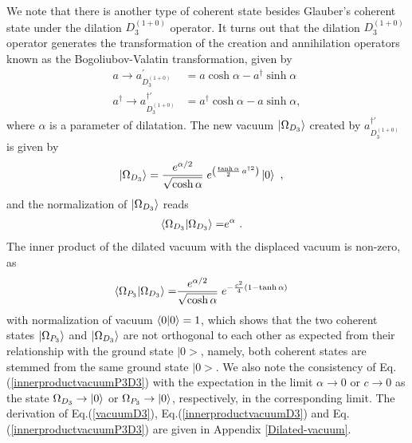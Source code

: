 \documentclass[%
 reprint,
superscriptaddress,
 amsmath,amssymb,
 aps,
]{revtex4-2}
\begin{document}
We note that there is another type of coherent state besides Glauber's coherent state under the dilation $D^{(1+0)}_{3}$ operator.
It turns out that the dilation $D^{(1+0)}_{3}$ operator generates  the transformation of the creation and annihilation operators known as the  Bogoliubov-Valatin transformation\cite{umezawa1982thermo}, given by
\begin{align}
    a \rightarrow a^{\prime}_{D^{(1+0)}_{3}}&=a\cosh{\alpha}-a^{\dagger}\sinh{\alpha}\label{aD1+0}\\
    a^{\dagger} \rightarrow a^{\dagger\prime}_{D^{(1+0)}_{3}}&=a^{\dagger}\cosh{\alpha}-a\sinh{\alpha},\label{adaggerD1+0}
\end{align}
where $\alpha$ is a parameter of dilatation. The new vacuum $\ket{\Omega_{D_{3}}}$ created by $a^{\dagger\prime}_{D^{(1+0)}_{3}}$ is given by
\begin{align}
    \ket{\Omega_{D_{3}}}&=\frac{e^{\alpha/2}}{\sqrt{\cosh\alpha}}\;
     e^{\left(\frac{\tanh\alpha}{2}\,a^{\dagger2}\right)}\ket{0}~,\label{vacuumD3}
\end{align}
and the normalization of $\ket{\Omega_{D_{3}}}$ reads
\begin{align}
    \braket{\Omega_{D_{3}}|\Omega_{D_{3}}}=&e^{\alpha}~.\label{innerproductvacuumD3}
\end{align}
The inner product of the dilated vacuum with the displaced vacuum is non-zero, as
\begin{align}   \braket{\Omega_{P_{3}}|\Omega_{D_{3}}} =&  \frac{e^{\alpha/2}}{\sqrt{\cosh\alpha}}\; e^{-\frac{c^2}{4}(1-\tanh\alpha)}\label{innerproductvacuumP3D3}
\end{align}
with normalization of vacuum $\braket{0|0}=1$, 
which shows that the two coherent states $\ket{\Omega_{P_{3}}}$ and $\ket{\Omega_{D_{3}}}$ are not orthogonal to each other as expected from their relationship with the ground state $|0>$, namely, both coherent states are stemmed from the same ground state $|0>$. We also note the consistency of Eq.(\ref{innerproductvacuumP3D3}) with the expectation in the limit $\alpha \to 0$ or $c \to 0$ as  the state $\Omega_{D_3} \to \ket{0}$ or $\Omega_{P_3} \to \ket{0}$, respectively, in the corresponding limit. 
The derivation of Eq.(\ref{vacuumD3}), Eq.(\ref{innerproductvacuumD3}) and Eq.(\ref{innerproductvacuumP3D3}) are given in Appendix \ref{Dilated-vacuum}.
\end{document}
